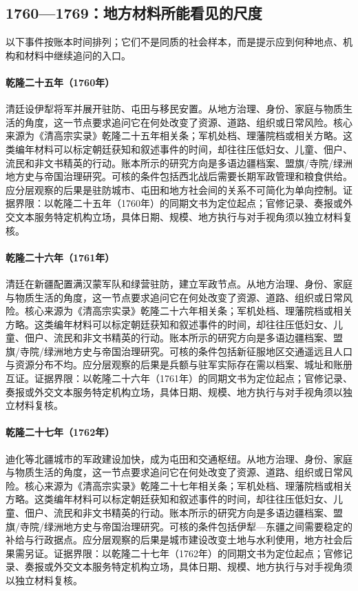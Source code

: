 \subsection{1760—1769：地方材料所能看见的尺度}
以下事件按账本时间排列；它们不是同质的社会样本，而是提示应到何种地点、机构和材料中继续追问的入口。
\hypertarget{social:EQ-1760-ILI-GENERAL}{}\paragraph{乾隆二十五年（1760年）}清廷设伊犁将军并展开驻防、屯田与移民安置。从地方治理、身份、家庭与物质生活的角度，这一节点要求追问它在何处改变了资源、道路、组织或日常风险。核心来源为《清高宗实录》乾隆二十五年相关条；军机处档、理藩院档或相关方略。这类编年材料可以标定朝廷获知和叙述事件的时间，却往往压低妇女、儿童、佃户、流民和非文书精英的行动。账本所示的研究方向是多语边疆档案、盟旗/寺院/绿洲地方史与帝国治理研究。可核的条件包括西北战后需要长期军政管理和粮食供给。应分层观察的后果是驻防城市、屯田和地方社会间的关系不可简化为单向控制。证据界限：以乾隆二十五年（1760年）的同期文书为定位起点；官修记录、奏报或外交文本服务特定机构立场，具体日期、规模、地方执行与对手视角须以独立材料复核。
\hypertarget{social:EQ-1761-XINJIANG-GARRISONS}{}\paragraph{乾隆二十六年（1761年）}清廷在新疆配置满汉蒙军队和绿营驻防，建立军政节点。从地方治理、身份、家庭与物质生活的角度，这一节点要求追问它在何处改变了资源、道路、组织或日常风险。核心来源为《清高宗实录》乾隆二十六年相关条；军机处档、理藩院档或相关方略。这类编年材料可以标定朝廷获知和叙述事件的时间，却往往压低妇女、儿童、佃户、流民和非文书精英的行动。账本所示的研究方向是多语边疆档案、盟旗/寺院/绿洲地方史与帝国治理研究。可核的条件包括新征服地区交通遥远且人口与资源分布不均。应分层观察的后果是兵额与驻军实际存在需以档案、城址和账册互证。证据界限：以乾隆二十六年（1761年）的同期文书为定位起点；官修记录、奏报或外交文本服务特定机构立场，具体日期、规模、地方执行与对手视角须以独立材料复核。
\hypertarget{social:EQ-1762-URUMQI-FOUNDATION}{}\paragraph{乾隆二十七年（1762年）}迪化等北疆城市的军政建设加快，成为屯田和交通枢纽。从地方治理、身份、家庭与物质生活的角度，这一节点要求追问它在何处改变了资源、道路、组织或日常风险。核心来源为《清高宗实录》乾隆二十七年相关条；军机处档、理藩院档或相关方略。这类编年材料可以标定朝廷获知和叙述事件的时间，却往往压低妇女、儿童、佃户、流民和非文书精英的行动。账本所示的研究方向是多语边疆档案、盟旗/寺院/绿洲地方史与帝国治理研究。可核的条件包括伊犁—东疆之间需要稳定的补给与行政据点。应分层观察的后果是城市建设改变土地与水利使用，地方社会后果需另证。证据界限：以乾隆二十七年（1762年）的同期文书为定位起点；官修记录、奏报或外交文本服务特定机构立场，具体日期、规模、地方执行与对手视角须以独立材料复核。
